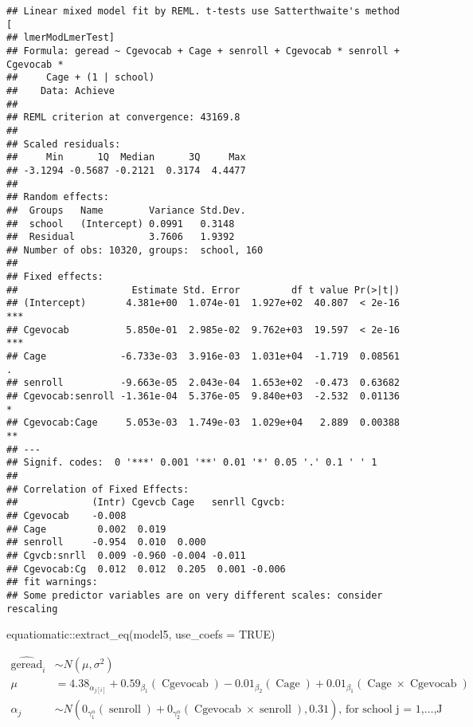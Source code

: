 \documentclass[
]{book}
\newenvironment{Shaded}{\begin{snugshade}}{\end{snugshade}}
\newcommand{\AttributeTok}[1]{\textcolor[rgb]{0.77,0.63,0.00}{#1}}
\newcommand{\ConstantTok}[1]{\textcolor[rgb]{0.00,0.00,0.00}{#1}}
\newcommand{\FunctionTok}[1]{\textcolor[rgb]{0.00,0.00,0.00}{#1}}
\newcommand{\NormalTok}[1]{#1}
\newcommand{\SpecialCharTok}[1]{\textcolor[rgb]{0.00,0.00,0.00}{#1}}
\begin{document}
\begin{verbatim}
## Linear mixed model fit by REML. t-tests use Satterthwaite's method [
## lmerModLmerTest]
## Formula: geread ~ Cgevocab + Cage + senroll + Cgevocab * senroll + Cgevocab *  
##     Cage + (1 | school)
##    Data: Achieve
## 
## REML criterion at convergence: 43169.8
## 
## Scaled residuals: 
##     Min      1Q  Median      3Q     Max 
## -3.1294 -0.5687 -0.2121  0.3174  4.4477 
## 
## Random effects:
##  Groups   Name        Variance Std.Dev.
##  school   (Intercept) 0.0991   0.3148  
##  Residual             3.7606   1.9392  
## Number of obs: 10320, groups:  school, 160
## 
## Fixed effects:
##                    Estimate Std. Error         df t value Pr(>|t|)    
## (Intercept)       4.381e+00  1.074e-01  1.927e+02  40.807  < 2e-16 ***
## Cgevocab          5.850e-01  2.985e-02  9.762e+03  19.597  < 2e-16 ***
## Cage             -6.733e-03  3.916e-03  1.031e+04  -1.719  0.08561 .  
## senroll          -9.663e-05  2.043e-04  1.653e+02  -0.473  0.63682    
## Cgevocab:senroll -1.361e-04  5.376e-05  9.840e+03  -2.532  0.01136 *  
## Cgevocab:Cage     5.053e-03  1.749e-03  1.029e+04   2.889  0.00388 ** 
## ---
## Signif. codes:  0 '***' 0.001 '**' 0.01 '*' 0.05 '.' 0.1 ' ' 1
## 
## Correlation of Fixed Effects:
##             (Intr) Cgevcb Cage   senrll Cgvcb:
## Cgevocab    -0.008                            
## Cage         0.002  0.019                     
## senroll     -0.954  0.010  0.000              
## Cgvcb:snrll  0.009 -0.960 -0.004 -0.011       
## Cgevocab:Cg  0.012  0.012  0.205  0.001 -0.006
## fit warnings:
## Some predictor variables are on very different scales: consider rescaling
\end{verbatim}

\begin{Shaded}
\begin{Highlighting}[]
\NormalTok{equatiomatic}\SpecialCharTok{::}\FunctionTok{extract\_eq}\NormalTok{(model5, }\AttributeTok{use\_coefs =} \ConstantTok{TRUE}\NormalTok{)}
\end{Highlighting}
\end{Shaded}

\[
\begin{aligned}
  \operatorname{\widehat{geread}}_{i}  &\sim N \left(\mu, \sigma^2 \right) \\
    \mu &=4.38_{\alpha_{j[i]}} + 0.59_{\beta_{1}}(\operatorname{Cgevocab}) - 0.01_{\beta_{2}}(\operatorname{Cage}) + 0.01_{\beta_{1}}(\operatorname{Cage} \times \operatorname{Cgevocab}) \\
    \alpha_{j}  &\sim N \left(0_{\gamma_{1}^{\alpha}}(\operatorname{senroll}) + 0_{\gamma_{2}^{\alpha}}(\operatorname{Cgevocab} \times \operatorname{senroll}), 0.31 \right)
    \text{, for school j = 1,} \dots \text{,J}
\end{aligned}
\]

  
\end{document}
